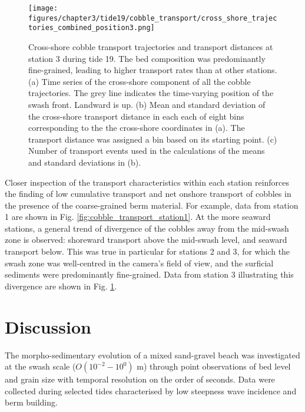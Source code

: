\begin{figure}[tbp] %
  	\texttt{[image: figures/chapter3/tide19/cobble\_transport/cross\_shore\_trajectories\_combined\_position3.png]}
 	\caption[Cross-shore cobble transport trajectories and distances: Station 3]{Cross-shore cobble transport trajectories and transport distances at station 3 during tide 19. The bed composition was predominantly fine-grained, leading to higher transport rates than at other stations. (a) Time series of the cross-shore component of all the cobble trajectories. The grey line indicates the time-varying position of the swash front. Landward  is up. (b) Mean and standard deviation of the cross-shore transport distance in each each of eight bins corresponding to the the cross-shore coordinates in (a). The transport distance was assigned a bin based on its starting point. (c) Number of transport events used in the calculations of the means and standard deviations in (b).}
 	\label{fig:cobble_transport_station3}
\end{figure}

Closer inspection of the transport characteristics within each station reinforces the finding of low cumulative transport and net onshore transport of cobbles in the presence of the coarse-grained berm material. For example, data from station 1 are shown in Fig. \ref{fig:cobble_transport_station1}. At the more seaward stations, a general trend of divergence of the cobbles away from the mid-swash zone is observed: shoreward transport above the mid-swash level, and seaward transport below. This was true in particular for stations 2 and 3, for which the swash zone was well-centred in the camera's field of view, and the surficial sediments were predominantly fine-grained. Data from station 3 illustrating this divergence are shown in Fig. \ref{fig:cobble_transport_station3}. %


\section{Discussion}\label{section:discussion}

The morpho-sedimentary evolution of a mixed sand-gravel beach was investigated at the swash scale ($O(10^{-2}-10^0)$ m) through point observations of bed level and grain size with temporal resolution on the order of seconds. Data were collected during selected tides characterised by low steepness wave incidence and berm building.  %

